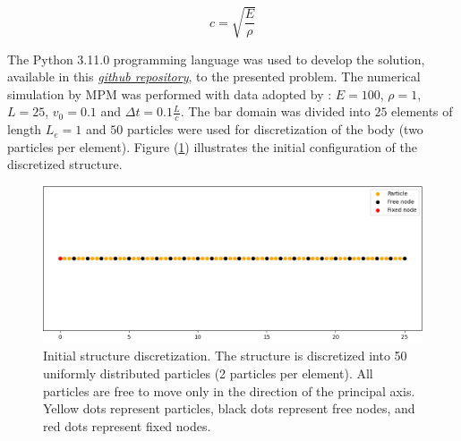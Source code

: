 \documentclass[preprint,12pt]{elsarticle}
\begin{document}
        \begin{equation}
            c = \sqrt{\frac{E}{\rho}}
            \label{eq:c}
        \end{equation}


	The Python 3.11.0 programming language was used to develop the solution, available in this \textit{\href{https://github.com/lorranfoliveira/mini_mpm}{github repository}}, to the presented problem. The numerical simulation by MPM was performed with data adopted by \cite{bardenhagen_energy_2002}: $E=100$, $\rho=1$, $L=25$, $v_0=0.1$ and $\Delta t=0.1\frac{L}{c}$. The bar domain was divided into $25$ elements of length $L_e=1$ and $50$ particles were used for discretization of the body (two particles per element). Figure (\ref{fig:domain}) illustrates the initial configuration of the discretized structure.
	
	\begin{figure}
    	\includegraphics[width=\linewidth]{exemplo_dominio.png}
    	\caption{Initial structure discretization. The structure is discretized into 50 uniformly distributed particles (2 particles per element). All particles are free to move only in the direction of the principal axis. Yellow dots represent particles, black dots represent free nodes, and red dots represent fixed nodes.}
    	\centering
    	\label{fig:domain}
    \end{figure}
    
\end{document}
